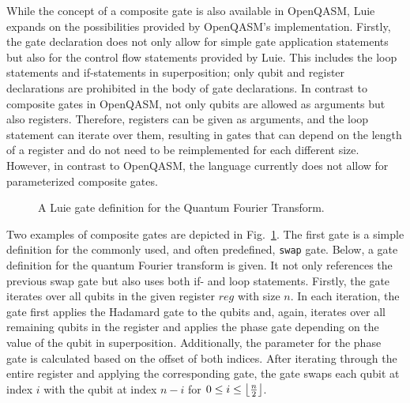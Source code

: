 While the concept of a composite gate is also available in OpenQASM, Luie expands on the possibilities provided by OpenQASM's implementation. Firstly, the gate declaration does not only allow for simple gate application statements but also for the control flow statements provided by Luie. This includes the loop statements and if-statements in superposition; only qubit and register declarations are prohibited in the body of gate declarations. In contrast to composite gates in OpenQASM, not only qubits are allowed as arguments but also registers. Therefore, registers can be given as arguments, and the loop statement can iterate over them, resulting in gates that can depend on the length of a register and do not need to be reimplemented for each different size. However, in contrast to OpenQASM, the language currently does not allow for parameterized composite gates.

\begin{figure}[htp]
    \centering     
    
    \caption{A Luie gate definition for the Quantum Fourier Transform.}
    \label{fig:qft_example}
\end{figure}

Two examples of composite gates are depicted in Fig.~\ref{fig:qft_example}. The first gate is a simple definition for the commonly used, and often predefined, \texttt{swap} gate. Below, a gate definition for the quantum Fourier transform is given. It not only references the previous swap gate but also uses both if- and loop statements. Firstly, the gate iterates over all qubits in the given register $reg$ with size $n$. In each iteration, the gate first applies the Hadamard gate to the qubits and, again, iterates over all remaining qubits in the register and applies the phase gate depending on the value of the qubit in superposition. Additionally, the parameter for the phase gate is calculated based on the offset of both indices. After iterating through the entire register and applying the corresponding gate, the gate swaps each qubit at index $i$ with the qubit at index $n - i$ for $0 \leq i \leq \floor*{\frac{n}{2}}$.